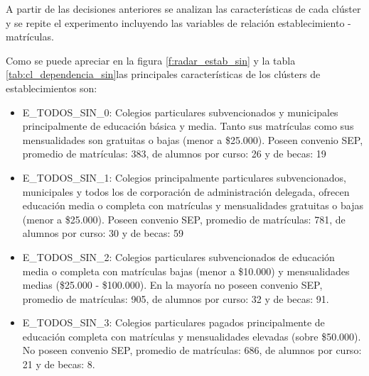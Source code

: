 A partir de las decisiones anteriores se analizan las características de cada clúster y se repite el experimento incluyendo las variables de relación establecimiento - matrículas.

Como se puede apreciar en la figura \ref{f:radar_estab_sin} y la tabla \ref{tab:cl_dependencia_sin}las principales características de los clústers de establecimientos son:

\begin{itemize}
    \item E\_TODOS\_SIN\_0: Colegios particulares subvencionados y municipales principalmente de educación básica y media. Tanto sus matrículas como sus mensualidades son gratuitas o bajas (menor a \$25.000). Poseen convenio SEP, promedio de matrículas: 383, de alumnos por curso: 26 y de becas: 19
    \item E\_TODOS\_SIN\_1: Colegios principalmente particulares subvencionados, municipales y todos los de corporación de administración delegada, ofrecen educación media o completa con matrículas y mensualidades gratuitas o bajas (menor a \$25.000). Poseen convenio SEP, promedio de matrículas: 781, de alumnos por curso: 30 y de becas: 59
    \item E\_TODOS\_SIN\_2: Colegios particulares subvencionados de educación media o completa con matrículas bajas (menor a \$10.000) y mensualidades medias (\$25.000 - \$100.000). En la mayoría no poseen convenio SEP, promedio de matrículas: 905, de alumnos por curso: 32 y de becas: 91.
    \item E\_TODOS\_SIN\_3: Colegios particulares pagados principalmente de educación completa con matrículas y mensualidades elevadas (sobre \$50.000). No poseen convenio SEP, promedio de matrículas: 686, de alumnos por curso: 21 y de becas: 8. 
\end{itemize}

